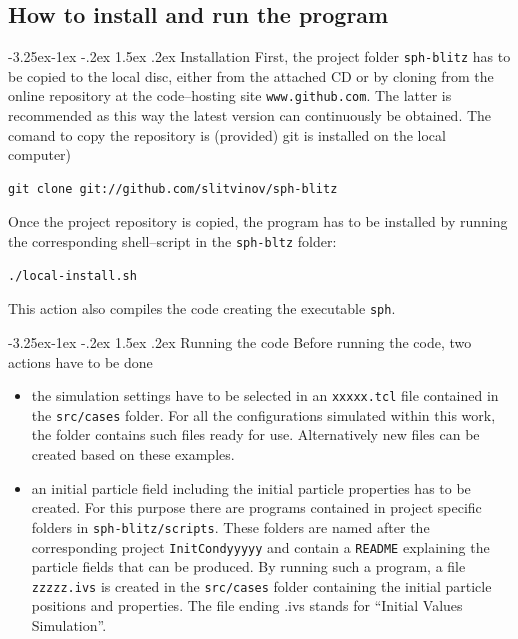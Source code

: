 \documentclass[11pt,a4paper,twoside]{report}
\makeatletter
\renewcommand\paragraph{\@startsection{paragraph}{4}{\z@}%
  {-3.25ex\@plus -1ex \@minus -.2ex}%
  {1.5ex \@plus .2ex}%
  {\normalfont\normalsize\bfseries}}
\makeatother
\begin{document}
\subsection{How to install and run the program}
\label{sec:HowToInstAndRun2D}
\paragraph{Installation}
First, the project folder {\tt sph-blitz} has to be copied to the local disc, either from the attached CD or by cloning from the online repository at the code--hosting site {\tt www.github.com}. The latter is recommended as this way the latest version can continuously be obtained. The comand to copy the repository is (provided) git is installed on the local computer)
\begin{verbatim}
git clone git://github.com/slitvinov/sph-blitz
\end{verbatim}
Once the project repository is copied, the program has to be installed by running the corresponding shell--script in the {\tt sph-bltz} folder:
\begin{verbatim}
./local-install.sh
\end{verbatim}
This action also compiles the code creating the executable {\tt sph}.

\paragraph{Running the code}
Before running the code, two actions have to be done
\begin{itemize}
 \item the simulation settings have to be selected in an {\tt xxxxx.tcl} file contained in the {\tt src/cases} folder. For all the configurations simulated within this work, the folder contains such files ready for use. Alternatively new files can be created based on these examples.
\item an initial particle field including the initial particle properties has to be created. For this purpose there are programs contained in project specific folders in {\tt sph-blitz/scripts}. These folders are named after the corresponding project {\tt InitCondyyyyy} and contain a {\tt README} explaining the particle fields that can be produced. By running such a program, a file {\tt zzzzz.ivs} is created in the {\tt src/cases} folder containing the initial particle positions and properties.
The file ending .ivs stands for ``Initial Values Simulation''.
 \end{itemize}
\end{document}
